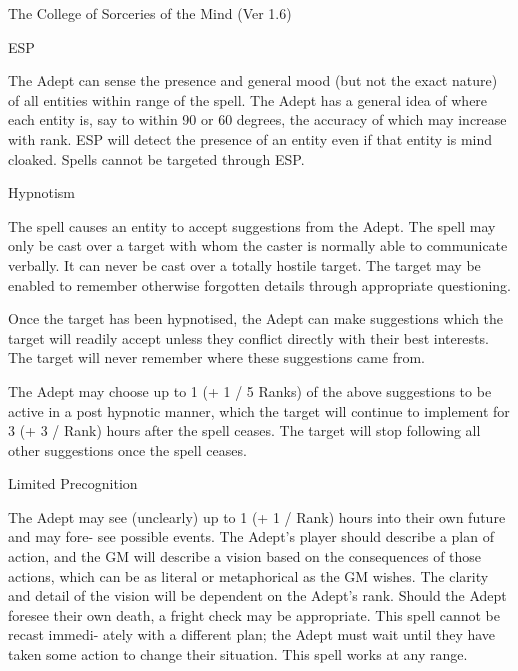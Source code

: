 \begin{Chapter}{The College of Sorceries of the Mind (Ver 1.6)}
\begin{spell}[G-4]{ESP}

\begin{effects}
The Adept can sense the presence and general mood (but not the exact
nature) of all entities within range of the spell.  The Adept has a
general idea of where each entity is, say to within 90 or 60 degrees,
the accuracy of which may increase with rank.  ESP will detect the
presence of an entity even if that entity is mind cloaked. Spells
cannot be targeted through ESP.
\end{effects}
\end{spell}

\begin{spell}[G-5]{Hypnotism}

\begin{effects}
The spell causes an entity to accept suggestions from the Adept.  The
spell may only be cast over a target with whom the caster is normally
able to communicate verbally.  It can never be cast over a totally
hostile target.  The target may be enabled to remember otherwise
forgotten details through appropriate questioning.

Once the target has been hypnotised, the Adept can make suggestions
which the target will readily accept unless they conflict directly
with their best interests.  The target will never remember where these
suggestions came from.

The Adept may choose up to 1 (+ 1 / 5 Ranks) of the above suggestions
to be active in a post hypnotic manner, which the target will continue
to implement for 3 (+ 3 / Rank) hours after the spell ceases.  The
target will stop following all other suggestions once the spell
ceases.
\end{effects}
\end{spell}

\begin{spell}[G-6]{Limited Precognition}

\begin{effects}
The Adept may see (unclearly) up to 1 (+ 1 / Rank) hours into their
own future and may fore- see possible events.  The Adept’s player
should describe a plan of action, and the GM will describe a vision
based on the consequences of those actions, which can be as literal or
metaphorical as the GM wishes. The clarity and detail of the vision
will be dependent on the Adept’s rank.  Should the Adept foresee their
own death, a fright check may be appropriate. This spell cannot be
recast immedi- ately with a different plan; the Adept must wait until
they have taken some action to change their situation. This spell
works at any range.
\end{effects}
\end{spell}


\end{Chapter}
